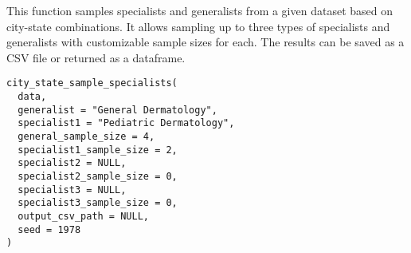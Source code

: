 \documentclass[a4paper]{book}
\begin{document}
%
\begin{Description}
This function samples specialists and generalists from a given dataset based on city-state combinations.
It allows sampling up to three types of specialists and generalists with customizable sample sizes for each.
The results can be saved as a CSV file or returned as a dataframe.
\end{Description}
%
\begin{Usage}
\begin{verbatim}
city_state_sample_specialists(
  data,
  generalist = "General Dermatology",
  specialist1 = "Pediatric Dermatology",
  general_sample_size = 4,
  specialist1_sample_size = 2,
  specialist2 = NULL,
  specialist2_sample_size = 0,
  specialist3 = NULL,
  specialist3_sample_size = 0,
  output_csv_path = NULL,
  seed = 1978
)
\end{verbatim}
\end{Usage}
%
\end{document}
